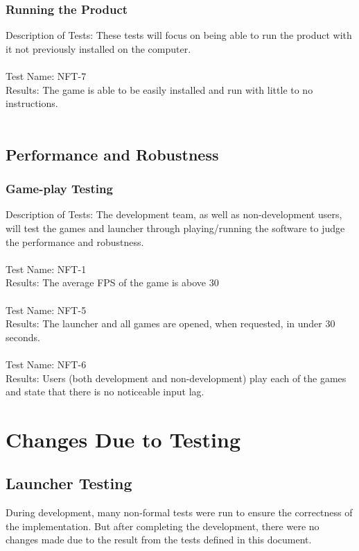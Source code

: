 \documentclass[12pt, titlepage]{article}
\begin{document}
	\subsubsection{Running the Product}
	Description of Tests: These tests will focus on being able to run the product with it not previously installed on the computer.\\ \\
	Test Name: NFT-7 \\
	Results: The game is able to be easily installed and run with little to no instructions. \\ \\

	\subsection{Performance and Robustness}
	
	\subsubsection{Game-play Testing}
	Description of Tests: The development team, as well as non-development users, will test the games and launcher through playing/running the software to judge the performance and robustness.\\ \\
	Test Name: NFT-1\\
	Results: The average FPS of the game is above 30\\ \\ 
	Test Name: NFT-5\\ 
	Results: The launcher and all games are opened, when requested, in under 30 seconds.\\ \\
	Test Name: NFT-6\\
	Results: Users (both development and non-development) play each of the games and state that there is no noticeable input lag.

\section{Changes Due to Testing}

	\subsection{Launcher Testing}
	During development, many non-formal tests were run to ensure the correctness of the implementation. But after completing the development, there were no changes made due to the result from the tests defined in this document.
	
\end{document}
